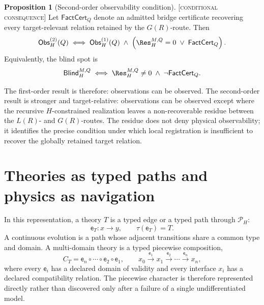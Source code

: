 \documentclass[10pt,twoside,a5paper]{article}
\newcommand{\Pspace}{\ensuremath{\mathcal P_H}}
\newcommand{\Edge}{\ensuremath{\mathsf e}}
\theoremstyle{definition}
\newtheorem{claimprop}{Proposition}
\begin{document}
\begin{claimprop}[Second-order observability condition]
\label{prop:second-order-observability-condition}
\textsc{[conditional consequence]} Let
$\mathsf{FactCert}_Q$ denote an admitted bridge certificate recovering every
target-relevant relation retained by the $G(R)$-route. Then
\begin{equation}
\mathsf{Obs}^{(2)}_H(Q)
\;\Longleftrightarrow\;
\mathsf{Obs}^{(1)}_H(Q)
\;\wedge\;
\left(
\Res_{H}^{M,Q}=0
\;\vee\;
\mathsf{FactCert}_Q
\right).
\label{eq:second-order-observability}
\end{equation}
Equivalently, the blind spot is
\begin{equation}
\mathsf{Blind}_{H}^{M,Q}
\;\Longleftrightarrow\;
\Res_{H}^{M,Q}\neq 0
\;\wedge\;
\neg\mathsf{FactCert}_Q.
\label{eq:H-self-selection-blind-spot}
\end{equation}
\end{claimprop}

The first-order result is therefore: observations can be observed. The
second-order result is stronger and target-relative: observations can be
observed except where the recursive $H$-constrained realization leaves a
non-recoverable residue between the $L(R)$- and $G(R)$-routes. The residue
does not deny physical observability; it identifies the precise condition under
which local registration is insufficient to recover the globally retained
target relation.

\section{Theories as typed paths and physics as navigation}
\label{sec:navigation}

In this representation, a theory $T$ is a typed edge or a typed path through
$\Pspace$:
\begin{equation}
\Edge_T:x\longrightarrow y,
\qquad \tau(\Edge_T)=T.
\label{eq:theory-edge}
\end{equation}
A continuous evolution is a path whose adjacent transitions share a common type and
domain. A multi-domain theory is a typed piecewise composition,
\begin{equation}
C_T=\Edge_n\circ\cdots\circ\Edge_2\circ\Edge_1,
\qquad
x_0\xrightarrow{\Edge_1}x_1\xrightarrow{\Edge_2}\cdots
\xrightarrow{\Edge_n}x_n,
\label{eq:piecewise}
\end{equation}
where every $\Edge_i$ has a declared domain of validity and every interface
$x_i$ has a declared compatibility relation. The piecewise character is therefore
represented directly rather than discovered only after a failure of a single
undifferentiated model.
\end{document}
